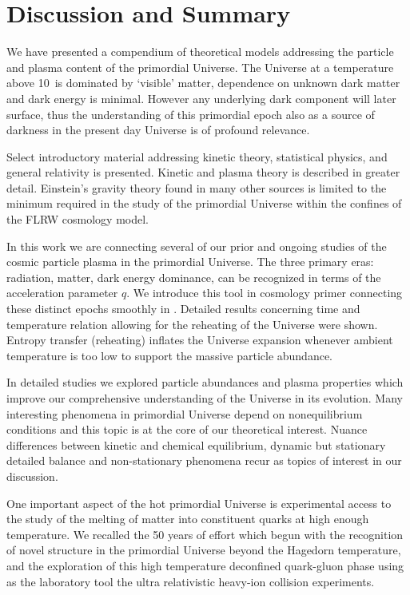 \section{Discussion and Summary}\label{part6}
We have presented a compendium of theoretical models addressing the particle and plasma content of the primordial Universe. The Universe at a temperature above 10\keV\ is dominated by `visible' matter, dependence on unknown dark matter and dark energy is minimal. However any underlying dark component will later surface, thus the understanding of this primordial epoch also as a source of darkness in the present day Universe is of profound relevance.

Select introductory material addressing kinetic theory, statistical physics, and general relativity is presented. Kinetic and plasma theory is described in greater detail. Einstein's gravity theory found in many other sources is limited to the minimum required in the study of the primordial Universe within the confines of the FLRW cosmology model. 

In this work we are connecting several of our prior and ongoing studies of the cosmic particle plasma in the primordial Universe. The three primary eras: radiation, matter, dark energy dominance, can be recognized in terms of the acceleration parameter $q$. We introduce this tool in cosmology primer  connecting these distinct epochs smoothly in . Detailed results concerning time and temperature relation allowing for the reheating of the Universe were shown. Entropy transfer (reheating) inflates the Universe expansion whenever ambient temperature is too low to support the massive particle abundance.

In detailed studies we explored particle abundances and plasma properties which improve our comprehensive understanding of the Universe in its evolution. Many interesting phenomena in primordial Universe depend on nonequilibrium conditions and this topic is at the core of our theoretical interest. Nuance differences between kinetic and chemical equilibrium, dynamic but stationary detailed balance and non-stationary phenomena recur as topics of interest in our discussion. 

One important aspect of the hot primordial Universe is experimental access to the study of the melting of matter into constituent quarks at high enough temperature. We recalled the 50 years of effort which begun with the recognition of novel structure in the primordial Universe beyond the Hagedorn temperature, and the exploration of this high temperature deconfined quark-gluon phase using as the laboratory tool the ultra relativistic heavy-ion collision experiments. 

